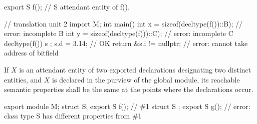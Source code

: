 \begin{std.txt}
\begin{before}
\begin{example}
\begin{codeblock}
      export S f();       // S attendant entity of f().

      // translation unit 2
      import M;
      int main() {
        int x = sizeof(decltype(f())::B);   // error: incomplete B
        int y = sizeof(decltype(f())::C);   // error: incomplete C
        decltype(f()) s { };
        s.d = 3.14;                         // OK
        return &s.i != nullptr;             // error: cannot take address of bitfield
      }
    \end{codeblock}
  \end{example}
\end{before}\begin{before}\color{addclr}
  \pnum
  If $X$ is an attendant entity of two exported declarations
  designating two distinct entities,
  and $X$ is declared in the purview of the global module,
  its reachable semantic properties shall
  be the same at the points where the declarations occur.
  \begin{example}
    \begin{codeblock}
      export module M;
      struct S;
      export S f();     // \#1
      struct S { };
      export S g();     // error: class type S has different properties from \#1
    \end{codeblock}
  \end{example}
  
\end{before}
\end{std.txt}
